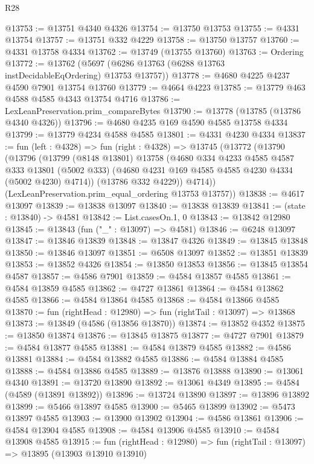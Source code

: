 \begin{lexlean}{R28}
\begin{coremodule}
@13753 := @13751 @4340 @4326
@13754 := @13750 @13753
@13755 := @4331 @13754
@13757 := @13751 @332 @4229
@13758 := @13750 @13757
@13760 := @4331 @13758 @4334
@13762 := @13749 (@13755 @13760)
@13763 := Ordering
@13772 := @13762 (@5697 (@6286 @13763 (@6288 @13763 instDecidableEqOrdering) @13753 @13757))
@13778 := @4680 @4225 @4237 @4590 @7901 @13754 @13760
@13779 := @4664 @4223
@13785 := @13779 @463 @4588 @4585 @4343 @13754 @4716
@13786 := LexLeanPreservation.prim_compareBytes
@13790 := @13778 (@13785 (@13786 @4340 @4326))
@13796 := @4680 @4235 @169 @4590 @4585 @13758 @4334
@13799 := @13779 @4234 @4588 @4585
@13801 := @4331 @4230 @4334
@13837 := fun (left : @4328) =>
  fun (right : @4328) =>
  @13745
    (@13772
      (@13790
        (@13796
          (@13799
            (@8148 @13801)
            @13758
            (@4680
              @334
              @4233
              @4585
              @4587
              @333
              @13801
              (@5002 @333)
              (@4680 @4231 @169 @4585 @4585 @4230 @4334 (@5002 @4230) @4714))
            (@13786 @332 @4229))
          @4714))
      (LexLeanPreservation.prim_equal_ordering @13753 @13757))
@13838 := @4617 @13097
@13839 := @13838 @13097
@13840 := @13838 @13839
@13841 := (state : @13840) -> @4581
@13842 := List.casesOn.{1, 0}
@13843 := @13842 @12980
@13845 := @13843 (fun ("_" : @13097) => @4581)
@13846 := @6248 @13097
@13847 := @13846 @13839
@13848 := @13847 @4326
@13849 := @13845 @13848
@13850 := @13846 @13097
@13851 := @6508 @13097
@13852 := @13851 @13839
@13853 := @13852 @4326
@13854 := @13850 @13853
@13856 := @13845 @13854 @4587
@13857 := @4586 @7901
@13859 := @4584 @13857 @4585
@13861 := @4584 @13859 @4585
@13862 := @4727 @13861
@13864 := @4584 @13862 @4585
@13866 := @4584 @13864 @4585
@13868 := @4584 @13866 @4585
@13870 := fun (rightHead : @12980) => fun (rightTail : @13097) => @13868
@13873 := @13849 (@4586 (@13856 @13870))
@13874 := @13852 @4352
@13875 := @13850 @13874
@13876 := @13845 @13875
@13877 := @4727 @7901
@13879 := @4584 @13877 @4585
@13881 := @4584 @13879 @4585
@13882 := @4586 @13881
@13884 := @4584 @13882 @4585
@13886 := @4584 @13884 @4585
@13888 := @4584 @13886 @4585
@13889 := @13876 @13888
@13890 := @13061 @4340
@13891 := @13720 @13890
@13892 := @13061 @4349
@13895 := @4584 (@4589 (@13891 @13892))
@13896 := @13724 @13890
@13897 := @13896 @13892
@13899 := @5466 @13897 @4585
@13900 := @5465 @13899
@13902 := @5473 @13897 @4585
@13903 := @13900 @13902
@13904 := @4586 @13861
@13906 := @4584 @13904 @4585
@13908 := @4584 @13906 @4585
@13910 := @4584 @13908 @4585
@13915 := fun (rightHead : @12980) => fun (rightTail : @13097) => @13895 (@13903 @13910 @13910)

\end{coremodule}
\end{lexlean}
